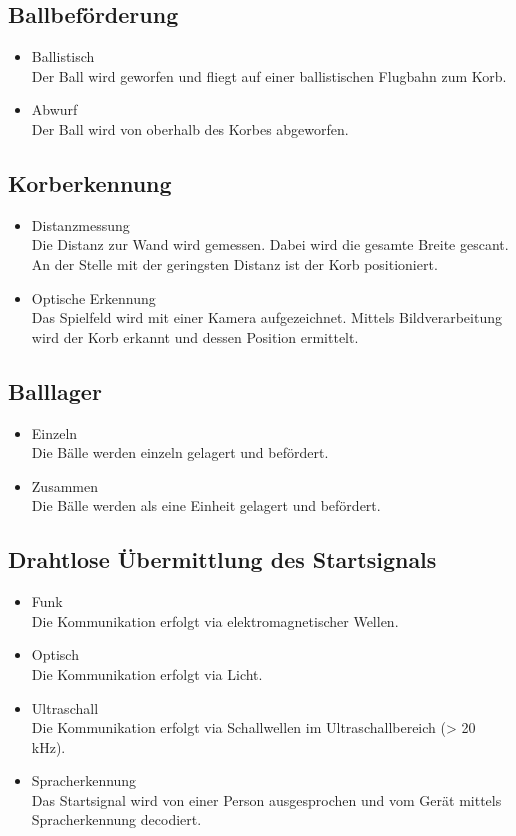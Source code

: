 \subsection{Ballbeförderung}
\begin{itemize}
    \item Ballistisch \\
        Der Ball wird geworfen und fliegt auf einer ballistischen Flugbahn zum 
        Korb. 
    \item Abwurf \\
        Der Ball wird von oberhalb des Korbes abgeworfen. 
\end{itemize}

\subsection{Korberkennung}
\begin{itemize}
    \item Distanzmessung \\
        Die Distanz zur Wand wird gemessen. Dabei wird die gesamte Breite 
        gescant. An der Stelle mit der geringsten Distanz ist der Korb 
        positioniert. 
    \item Optische Erkennung \\
        Das Spielfeld wird mit einer Kamera aufgezeichnet. Mittels 
        Bildverarbeitung wird der Korb erkannt und dessen Position ermittelt. 
\end{itemize}

\subsection{Balllager}
\begin{itemize}
    \item Einzeln \\
        Die Bälle werden einzeln gelagert und befördert. 
    \item Zusammen \\
        Die Bälle werden als eine Einheit gelagert und befördert. 
\end{itemize}

\subsection{Drahtlose Übermittlung des Startsignals}
\begin{itemize}
    \item Funk \\
        Die Kommunikation erfolgt via elektromagnetischer Wellen. 
    \item Optisch \\
        Die Kommunikation erfolgt via Licht. 
    \item Ultraschall \\
        Die Kommunikation erfolgt via Schallwellen im Ultraschallbereich 
        (> 20 kHz). 
    \item Spracherkennung \\
        Das Startsignal wird von einer Person ausgesprochen und vom Gerät 
        mittels Spracherkennung decodiert. 
\end{itemize}

